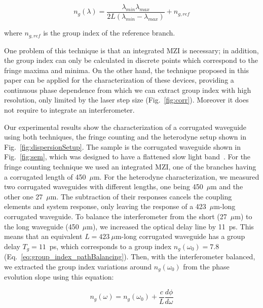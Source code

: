 \documentclass[journal]{IEEEtran}
\begin{document}
\begin{equation}
  n_g (\lambda)=\frac{\lambda_{min} \lambda_{max}}{ 2L (\lambda_{min} - \lambda_{max})} + n_{g,ref}
\label{eq:fringes}
\end{equation}

where $n_{g,ref}$ is the group index of the reference branch.

One problem of this technique is that an integrated MZI is necessary; in addition, the group index can only be calculated in discrete points which correspond to the fringe maxima and minima. On the other hand, the technique proposed in this paper can be applied for the characterization of these devices, providing a continuous phase dependence from which we can extract group index with high resolution, only limited by the laser step size (Fig.~\ref{fig:corr}). Moreover it does not require to integrate an interferometer.

Our experimental results show the characterization of a corrugated waveguide using both techniques, the fringe counting and the heterodyne setup shown in Fig.~\ref{fig:dispersionSetup}. The sample is the corrugated waveguide shown in Fig.~\ref{fig:sem}, which was designed to have a flattened slow light band~\cite{Brimont2010}. For the fringe counting technique we used an integrated MZI, one of the branches having a corrugated length of 450~$\mu$m. For the heterodyne characterization, we measured two corrugated waveguides with different lengths, one being 450~$\mu$m and the other one 27~$\mu$m. The subtraction of their responses cancels the coupling elements and system response, only leaving the response of a 423~$\mu$m-long corrugated waveguide.
To balance the interferometer from the short (27~$\mu$m) to the long waveguide (450~$\mu$m), we increased the optical delay line by 11~ps.
This means that an equivalent $L=423~\mu$m-long corrugated waveguide has a group delay $T_g=11$~ps, which corresponds to a group index $n_g(\omega_0)=7.8$ (Eq.~\ref{eq:group_index_pathBalancing}). Then, with the interferometer balanced, we extracted the group index variations around $n_g(\omega_0)$ from the phase evolution slope using this equation:

\begin{equation}
  n_g (\omega)=  n_g(\omega_0) + \frac{c}{L} \frac{d\phi}{d\omega}
 \label{eq:groupIndexEvolution}
\end{equation}
\end{document}
